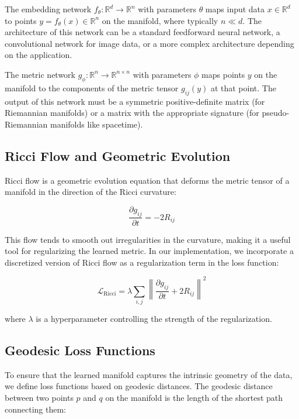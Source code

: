 \documentclass[11pt,a4paper]{article}
\begin{document}
The embedding network $f_\theta: \mathbb{R}^d \to \mathbb{R}^n$ with parameters $\theta$ maps input data $x \in \mathbb{R}^d$ to points $y = f_\theta(x) \in \mathbb{R}^n$ on the manifold, where typically $n \ll d$. The architecture of this network can be a standard feedforward neural network, a convolutional network for image data, or a more complex architecture depending on the application.

The metric network $g_\phi: \mathbb{R}^n \to \mathbb{R}^{n \times n}$ with parameters $\phi$ maps points $y$ on the manifold to the components of the metric tensor $g_{ij}(y)$ at that point. The output of this network must be a symmetric positive-definite matrix (for Riemannian manifolds) or a matrix with the appropriate signature (for pseudo-Riemannian manifolds like spacetime).

\subsection{Ricci Flow and Geometric Evolution}

Ricci flow is a geometric evolution equation that deforms the metric tensor of a manifold in the direction of the Ricci curvature:

\begin{equation}
    \frac{\partial g_{ij}}{\partial t} = -2 R_{ij}
\end{equation}

This flow tends to smooth out irregularities in the curvature, making it a useful tool for regularizing the learned metric. In our implementation, we incorporate a discretized version of Ricci flow as a regularization term in the loss function:

\begin{equation}
    \mathcal{L}_{\text{Ricci}} = \lambda \sum_{i,j} \left\| \frac{\partial g_{ij}}{\partial t} + 2 R_{ij} \right\|^2
\end{equation}

where $\lambda$ is a hyperparameter controlling the strength of the regularization.

\subsection{Geodesic Loss Functions}

To ensure that the learned manifold captures the intrinsic geometry of the data, we define loss functions based on geodesic distances. The geodesic distance between two points $p$ and $q$ on the manifold is the length of the shortest path connecting them:
\end{document}
